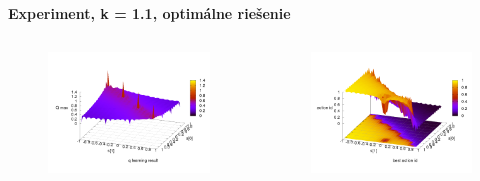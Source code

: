 \documentclass[xcolor=dvipsnames]{beamer}
\begin{document}
\begin{frame}{\bf Experiment, k = 1.1, optimálne riešenie}

\begin{columns}
	\begin{column}{0.5\textwidth}

        \begin{figure}[ht]

        \begin{center}
        \includegraphics[width=1.0\textwidth]{experiment_01/table/q_map.png}
        \end{center}

        \end{figure}

	\end{column}
	\begin{column}{0.5\textwidth}

        \begin{figure}[ht]

        \begin{center}
        \includegraphics[width=1.0\textwidth]{experiment_01/table/q_action_id.png}
        \end{center}


\end{figure}
\end{column}
\end{columns}
\end{frame}
\end{document}
